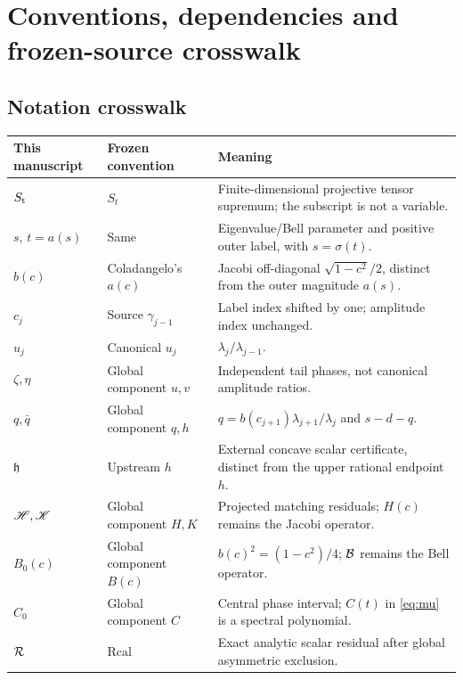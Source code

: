 \section{Conventions, dependencies and frozen-source crosswalk}
\label{app:crosswalk}
\subsection{Notation crosswalk}
\begin{longtable}{>{\raggedright\arraybackslash}p{}>{\raggedright\arraybackslash}p{}>{\raggedright\arraybackslash}p{}}
This manuscript & Frozen convention & Meaning\\ \hline
\(S_{\mathrm t}\) & \(S_t\) & Finite-dimensional projective tensor supremum;
the subscript is not a variable.\\
\(s\), \(t=a(s)\) & Same & Eigenvalue/Bell parameter and positive outer
label, with \(s=\sigma(t)\).\\
\(b(c)\) & Coladangelo's \(a(c)\) & Jacobi off-diagonal
\(\sqrt{1-c^2}/2\), distinct from the outer magnitude \(a(s)\).\\
\(c_j\) & Source \(\gamma_{j-1}\) & Label index shifted by one;
amplitude index unchanged.\\
\(u_j\) & Canonical \(u_j\) & \(\lambda_j/\lambda_{j-1}\).\\
\(\zeta,\eta\) & Global component \(u,v\) & Independent tail phases,
not canonical amplitude ratios.\\
\(q,\bar q\) & Global component \(q,h\) &
\(q=b(c_{j+1})\lambda_{j+1}/\lambda_j\) and \(s-d-q\).\\
\(\mathfrak h\) & Upstream \(h\) & External concave scalar certificate,
distinct from the upper rational endpoint \(h\).\\
\(\mathscr H,\mathscr K\) & Global component \(H,K\) & Projected matching residuals;
\(H(c)\) remains the Jacobi operator.\\
\(B_0(c)\) & Global component \(B(c)\) & \(b(c)^2=(1-c^2)/4\);
\(\mathcal B\) remains the Bell operator.\\
\(C_0\) & Global component \(C\) & Central phase interval; \(C(t)\)
in \eqref{eq:mu} is a spectral polynomial.\\
\(\mathcal R\) & \(\mathrm{Rcal}\) & Exact analytic scalar residual after
global asymmetric exclusion.\\
\end{longtable}

